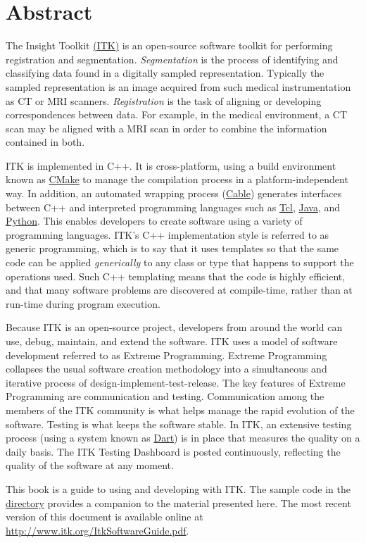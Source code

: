 \chapter*{Abstract}
\noindent
The Insight Toolkit \href{http://www.itk.org}{(ITK)} is an open-source
software toolkit for performing registration and
segmentation. \emph{Segmentation} is the process of identifying and
classifying data found in a digitally sampled
representation. Typically the sampled representation is an image
acquired from such medical instrumentation as CT or MRI
scanners. \emph{Registration} is the task of aligning or developing
correspondences between data. For example, in the medical environment,
a CT scan may be aligned with a MRI scan in order to combine the
information contained in both.

ITK is implemented in C++. It is cross-platform, using a build
environment known as \href{http://www.cmake.org}{CMake} to manage the
compilation process in a platform-independent way. In addition, an
automated wrapping process
(\href{http://public.kitware.com/Cable/HTML/Index.html}{Cable})
generates interfaces between C++ and interpreted programming languages
such as \href{http://tcl.sourceforge.net}{Tcl}, 
\href{http://java.sun.com}{Java}, and 
\href{http://www.python.org}{Python}. This
enables developers to create software using a variety of programming
languages. ITK's C++ implementation style is referred to as generic
programming, which is to say that it uses templates so that the same
code can be applied \emph{generically} to any class or type that
happens to support the operations used. Such C++
templating means that the code is highly efficient, and that many
software problems are discovered at compile-time, rather than at
run-time during program execution.

Because ITK is an open-source project, developers from around the
world can use, debug, maintain, and extend the software. ITK uses a
model of software development referred to as Extreme
Programming. Extreme Programming collapses the usual software creation
methodology into a simultaneous and iterative process of
design-implement-test-release. The key features of Extreme Programming
are communication and testing. Communication among the members of the
ITK community is what helps manage the rapid evolution of the
software.  Testing is what keeps the software stable. In ITK, an
extensive testing process (using a system known as
\href{http://public.kitware.com/dashboard.php}{Dart}) is in place that
measures the quality on a daily basis. The ITK Testing Dashboard is
posted continuously, reflecting the quality of the software at any
moment.

This book is a guide to using and developing with ITK. The sample code
in the
\href{http://www.itk.org/cgi-bin/viewcvs.cgi/Examples/?root=Insight}
{directory} provides a companion to the material presented here.  The
most recent version of this document is available online at
\url{http://www.itk.org/ItkSoftwareGuide.pdf}.



